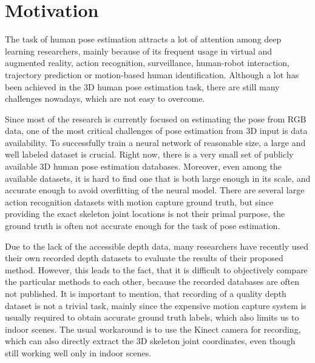\chapter{Motivation}\label{chap:motivation}

The task of human pose estimation attracts a lot of attention among deep learning researchers, mainly because of its frequent usage in virtual and augmented reality, action recognition, surveillance, human-robot interaction, trajectory prediction or motion-based human identification. Although a lot has been achieved in the 3D human pose estimation task, there are still many challenges nowadays, which are not easy to overcome.\par
\vspace{5mm}
\noindent Since most of the research is currently focused on estimating the pose from RGB data, one of the most critical challenges of pose estimation from 3D input is data availability. To successfully train a neural network of reasonable size, a large and well labeled dataset is crucial. Right now, there is a very small set of publicly available 3D human pose estimation databases. Moreover, even among the available datasets, it is hard to find one that is both large enough in its scale, and accurate enough to avoid overfitting of the neural model. There are several large action recognition datasets with motion capture ground truth, but since providing the exact skeleton joint locations is not their primal purpose, the ground truth is often not accurate enough for the task of pose estimation.\par
\vspace{5mm}
\noindent Due to the lack of the accessible depth data, many researchers have recently used their own recorded depth datasets to evaluate the results of their proposed method. However, this leads to the fact, that it is difficult to objectively compare the particular methods to each other, because the recorded databases are often not published.
It is important to mention, that recording of a quality depth dataset is not a trivial task, mainly since the expensive motion capture system is usually required to obtain accurate ground truth labels, which also limits us to indoor scenes. The usual workaround is to use the Kinect camera for recording, which can also directly extract the 3D skeleton joint coordinates, even though still working well only in indoor scenes.\par
